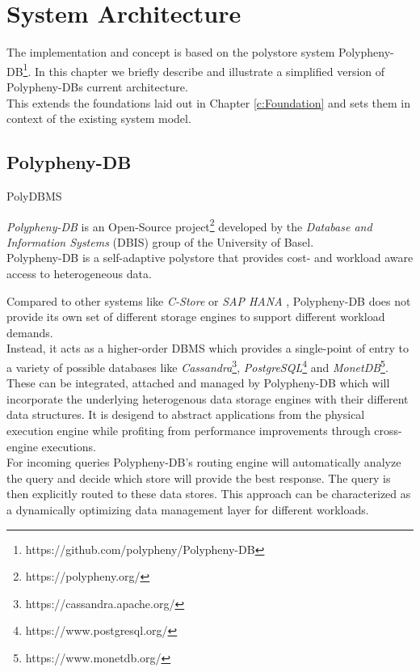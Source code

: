 \chapter{System Architecture}
\label{c:architecture}

The implementation and concept is based on the polystore system Polypheny-DB\footnote{https://github.com/polypheny/Polypheny-DB}.
In this chapter we briefly describe and illustrate a simplified version of Polypheny-DBs current architecture.\\
This extends the foundations laid out in Chapter \ref{c:Foundation} and sets them in context of the existing system model.






\section{Polypheny-DB}
PolyDBMS \cite{polypheny2021}

\textit{Polypheny-DB} is an Open-Source project\footnote{https://polypheny.org/} developed by 
the \textit{Database and Information Systems} (DBIS) group of the University of Basel.\\

Polypheny-DB is a self-adaptive polystore that provides cost- and workload aware access to heterogeneous data\cite{poly2020}.

Compared to other systems like \textit{C-Store}\cite{cstore_2005} or \textit{SAP HANA} \cite{hana_2012}, 
Polypheny-DB does not provide its own set of different storage engines to support 
different workload demands.\\
Instead, it acts as a higher-order DBMS which provides a single-point of entry to 
a variety of possible databases like 
\textit{Cassandra}\footnote{https://cassandra.apache.org/}, 
\textit{PostgreSQL}\footnote{https://www.postgresql.org/} 
and \textit{MonetDB}\footnote{https://www.monetdb.org/}. 
These can be integrated, attached and managed by Polypheny-DB which will incorporate the underlying 
heterogenous data storage engines with their different data structures. It is 
desigend to abstract applications from the physical execution engine while profiting from 
performance improvements through cross-engine executions. 
\\
For incoming queries Polypheny-DB's routing engine will automatically analyze the query and decide 
which store will provide the best response. The query is then explicitly routed to these data stores. 
This approach can be characterized as a dynamically optimizing data management layer for different workloads.


